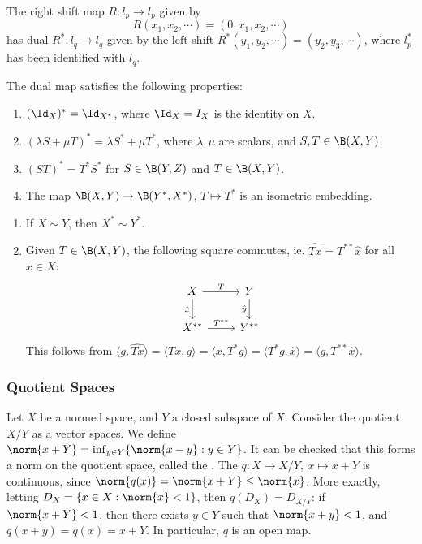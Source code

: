 \documentclass[a4paper]{article}
\begin{document}
\begin{eg}
  The right shift map $R:l_p\to l_p$ given by
  \[
    R(x_1,x_2,\cdots)=(0,x_1,x_2,\cdots)
  \]
  has dual $R^*:l_q\to l_q$ given by the left shift $R^*(y_1,y_2,\cdots)=(y_2,y_3,\cdots)$, where $l_p^*$ has been identified with $l_q$.
\end{eg}

The dual map satisfies the following properties:
\begin{enumerate}[label=(\arabic*)]
  \item $(\Id_X)^*=\Id_{X^*}$, where $\Id_X=I_X$ is the identity on $X$.
  \item $(\lambda S+\mu T)^*=\lambda S^*+\mu T^*$, where $\lambda,\mu$ are scalars, and $S,T\in\B(X,Y)$.
  \item $(ST)^*=T^*S^*$ for $S\in\B(Y,Z)$ and $T\in\B(X,Y)$.
  \item The map $\B(X,Y)\to\B(Y^*,X^*)$, $T\mapsto T^*$ is an isometric embedding.
\end{enumerate}

\begin{remark}
  \begin{enumerate}[label=(\arabic*)]
    \item If $X\sim Y$, then $X^*\sim Y^*$.
    \item Given $T\in\B(X,Y)$, the following square commutes, ie. $\widehat{Tx}=T^{**}\hat{x}$ for all $x\in X$:
    \[
      \begin{tikzcd}
        X \arrow[r, "T"] \arrow[d, "\hat{x}"'] & Y \arrow[d, "\hat{y}"'] \\
        X^{**} \arrow[r, "T^{**}"]& Y^{**}
      \end{tikzcd}
	 \]
    This follows from $\langle g,\widehat{Tx}\rangle=\langle Tx,g\rangle=\langle x,T^*g\rangle=\langle T^*g,\hat{x}\rangle=\langle g,T^{**}\hat{x}\rangle$.
  \end{enumerate}
\end{remark}

\subsubsection*{Quotient Spaces}
Let $X$ be a normed space, and $Y$ a closed subspace of $X$. Consider the quotient $X/Y$ as a vector spaces. We define $\norm{x+Y}=\inf_{y\in Y}\{\norm{x-y}:y\in Y\}$. It can be checked that this forms a norm on the quotient space, called the . The  $q:X\to X/Y,\ x\mapsto x+Y$ is continuous, since $\norm{q(x)}=\norm{x+Y}\leq\norm{x}$. More exactly, letting $D_X=\{x\in X:\norm{x}<1\}$, then $q(D_X)=D_{X/Y}$: if $\norm{x+Y}<1$, then there exists $y\in Y$ such that $\norm{x+y}<1$, and $q(x+y)=q(x)=x+Y$. In particular, $q$ is an open map.
\end{document}
